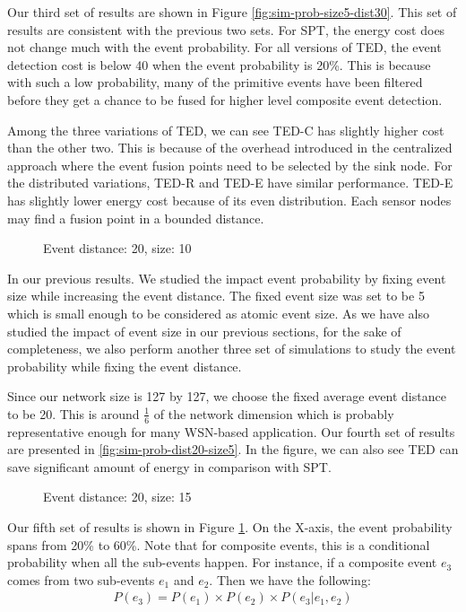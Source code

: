 Our third set of results are shown in Figure \ref{fig:sim-prob-size5-dist30}. This set of results are consistent with the previous two sets. For SPT, the energy cost does not change much with the event probability. For all versions of TED, the event detection cost is below 40 when the event probability is 20\%. This is because with such a low probability, many of the primitive events have been filtered before they get a chance to be fused for higher level composite event detection.

Among the three variations of TED, we can see TED-C has slightly higher cost than the other two. This is because of the overhead introduced in the centralized approach where the event fusion points need to be selected by the sink node. For the distributed variations, TED-R and TED-E have similar performance. TED-E has slightly lower energy cost because of its even distribution. Each sensor nodes may find a fusion point in a bounded distance.

\begin{figure}
\centering
{}
\caption{Event distance: 20, size: 10}
\label{fig:sim-prob-dist20-size10}
\end{figure}

In our previous results. We studied the impact event probability by fixing event size while increasing the event distance. The fixed event size was set to be 5 which is small enough to be considered as atomic event size. As we have also studied the impact of event size in our previous sections, for the sake of completeness, we also perform another three set of simulations to study the event probability while fixing the event distance.

Since our network size is 127 by 127, we choose the fixed average event distance to be 20. This is around \(\frac{1}{6}\) of the network dimension which is probably representative enough for many WSN-based application. Our fourth set of results are presented in \ref{fig:sim-prob-dist20-size5}. In the figure, we can also see TED can save significant amount of energy in comparison with SPT.

\begin{figure}
\centering
{}
\caption{Event distance: 20, size: 15}
\label{fig:sim-prob-dist20-size15}
\end{figure}

Our fifth set of results is shown in Figure \ref{fig:sim-prob-dist20-size10}. On the X-axis, the event probability spans from 20\% to 60\%. Note that for composite events, this is a conditional probability when all the sub-events happen. For instance, if a composite event \(e_3\) comes from two sub-events \(e_1\) and \(e_2\). Then we have the following:
\begin{align*}
P(e_3) = P(e_1) \times P(e_2) \times P(e_3|e_1, e_2)
\end{align*}

